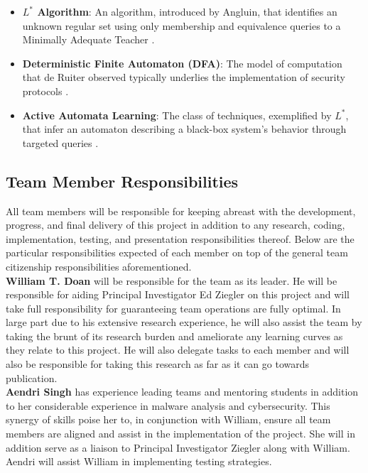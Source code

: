 \documentclass[11pt]{article}
\begin{document}
\begin{itemize}
    \item \textbf{$L^*$ Algorithm}: An algorithm, introduced by Angluin, that identifies an unknown regular set using only membership and equivalence queries to a Minimally Adequate Teacher \cite{angluin1987}.
    \item \textbf{Deterministic Finite Automaton (DFA)}: The model of computation that de Ruiter observed typically underlies the implementation of security protocols \cite{deruiter2015}.
    \item \textbf{Active Automata Learning}: The class of techniques, exemplified by $L^*$, that infer an automaton describing a black-box system's behavior through targeted queries \cite{deruiter2015}.
\end{itemize}

\subsection{Team Member Responsibilities}
All team members will be responsible for keeping abreast with the development, progress, and final delivery of this project in addition to any research, coding, implementation, testing, and presentation responsibilities thereof. Below are the particular responsibilities expected of each member on top of the general team citizenship responsibilities aforementioned.  \\

\noindent
\textbf{William T. Doan} will be responsible for the team as its leader. He will be responsible for aiding Principal Investigator Ed Ziegler on this project and will take full responsibility for guaranteeing team operations are fully optimal. In large part due to his extensive research experience, he will also assist the team by taking the brunt of its research burden and ameliorate any learning curves as they relate to this project. He will also delegate tasks to each member and will also be responsible for taking this research as far as it can go towards publication. \\

\noindent
\textbf{Aendri Singh} has experience leading teams and mentoring students in addition to her considerable experience in malware analysis and cybersecurity. This synergy of skills poise her to, in conjunction with William, ensure all team members are aligned and assist in the implementation of the project. She will in addition serve as a liaison to Principal Investigator Ziegler along with William. Aendri will assist William in implementing testing strategies. \\
\end{document}
